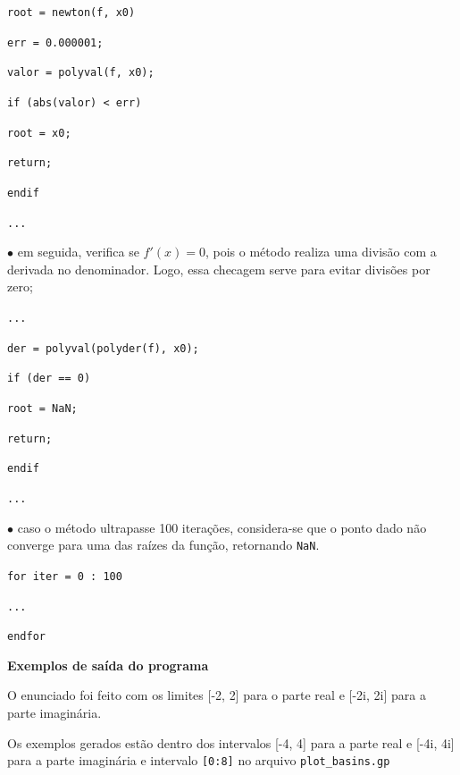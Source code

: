 \documentclass{article}
\begin{document}
\begin{flushleft}
\qquad\texttt{root = newton(f, x0)}

\qquad\qquad\texttt{err = 0.000001;}

\qquad\qquad\texttt{valor = polyval(f, x0);}

\qquad\qquad\texttt{if (abs(valor) < err)}

\qquad\qquad\qquad\texttt{root = x0;}

\qquad\qquad\qquad\texttt{return;}

\qquad\qquad\texttt{endif}

\qquad\qquad\texttt{...}
\end{flushleft}

\qquad\quad$\bullet$ em seguida, verifica se $f'(x) = 0$, pois o método realiza uma divisão com a derivada no denominador. Logo, essa checagem serve para evitar divisões por zero;

\begin{flushleft}
\qquad\qquad\texttt{...}

\qquad\qquad\texttt{der = polyval(polyder(f), x0);}

\qquad\qquad\texttt{if (der == 0)}

\qquad\qquad\qquad\texttt{root = NaN;}

\qquad\qquad\qquad\texttt{return;}

\qquad\qquad\texttt{endif}

\qquad\qquad\texttt{...}
\end{flushleft}

\qquad\quad$\bullet$ caso o método ultrapasse 100 iterações, considera-se que o ponto dado não converge para uma das raízes da função, retornando \texttt{NaN}.

\begin{flushleft}
\qquad\qquad\texttt{for iter = 0 : 100}

\qquad\qquad\qquad\texttt{...}

\qquad\qquad\texttt{endfor}
\end{flushleft}

\bigskip
\qquad\textbf{Exemplos de saída do programa}

\qquad\quad O enunciado foi feito com os limites [-2, 2] para o parte real e [-2i, 2i] para a parte imaginária.

\qquad\quad Os exemplos gerados estão dentro dos intervalos [-4, 4] para a parte real e 
[-4i, 4i] para a parte imaginária e intervalo \texttt{[0:8]} no arquivo \texttt{plot\_basins.gp}
\end{document}
